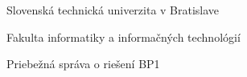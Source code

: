\begin{center}
\thispagestyle{empty}
{\Large Slovenská technická univerzita v Bratislave}
\par\end{center}{\Large \par}

\begin{center}
{\Large Fakulta informatiky a informačných technológií}
\par\end{center}{\Large \par}

\smallskip{}

\begin{center}
\myEvidenceNumber
\par\end{center}
\vfill{}

\begin{center}
\textbf{\Large \myName}
\par\end{center}{\Large \par}

\medskip{}


\begin{center}
\textbf{\LARGE \myTitle }
\par\end{center}{\huge \par}

\medskip{}


\begin{center}

{\Large Priebežná správa o riešení BP1}
\par\end{center}{\Large \par}

\vfill{}